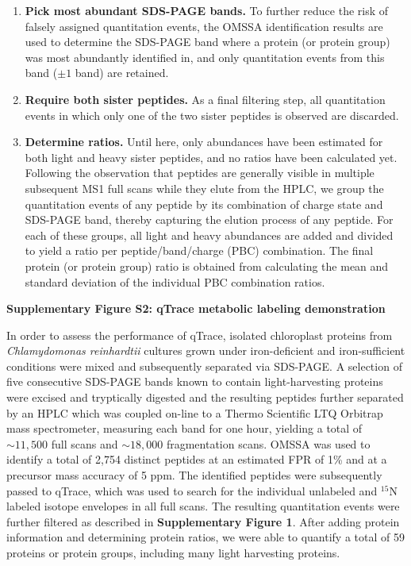 \documentclass[11pt,letterpaper]{article}
\begin{document}
\begin{enumerate}
\item {\bf Pick most abundant SDS-PAGE bands.}
To further reduce the risk of falsely assigned quantitation events, the OMSSA
identification results are used to determine the SDS-PAGE band where a 
protein (or protein group) was most abundantly identified in, and only 
quantitation events from this band ($\pm 1$ band) are retained.

\item {\bf Require both sister peptides.}
As a final filtering step, all quantitation events in which only one of the two
sister peptides is observed are discarded.

\item {\bf Determine ratios.}
Until here, only abundances have been estimated for both light and heavy sister
peptides, and no ratios have been calculated yet. Following the observation that
peptides are generally visible in multiple subsequent MS1 full scans while they
elute from the HPLC, we group the quantitation events of any peptide by its
combination of charge state and SDS-PAGE band, thereby capturing the elution 
process of any peptide. For each of these groups, all light and 
heavy abundances are added and divided to yield a ratio per 
peptide/band/charge (PBC) combination. The final protein (or 
protein group) ratio is obtained from calculating the mean and standard 
deviation of the individual PBC combination ratios.

\end{enumerate}

\clearpage  

{\bf \LARGE Supplementary Figure S2: qTrace metabolic labeling demonstration}

In order to assess the performance of qTrace, isolated chloroplast proteins from 
{\em Chlamydomonas reinhardtii} cultures grown under iron-deficient and 
iron-sufficient conditions were mixed and subsequently separated
via SDS-PAGE. A selection of five consecutive SDS-PAGE bands known to contain 
light-harvesting proteins were excised and tryptically digested and the 
resulting peptides further separated by an HPLC which was coupled on-line to a 
Thermo Scientific LTQ Orbitrap mass spectrometer, measuring each band for one 
hour, yielding a total of $\sim11,500$ full scans and $\sim18,000$ 
fragmentation scans. 
OMSSA was used to identify a total of 2,754 distinct peptides at an estimated 
FPR of 1\% and at a precursor mass accuracy of 5 ppm. 
The identified 
peptides were subsequently passed to qTrace, which was used to search for the 
individual unlabeled and $^{15}$N labeled isotope envelopes in all full scans. 
The resulting quantitation events were further filtered as described in 
{\bf Supplementary Figure 1}. 
After adding protein information and determining protein ratios, we were able to 
quantify a total of 59 proteins or protein groups, including many light 
harvesting proteins.
\end{document}
